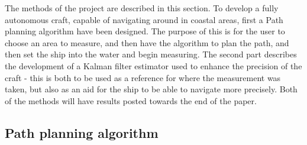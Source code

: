 \documentclass{ifacconf}
\begin{document}
The methods of the project are described in this section. To develop a fully autonomous craft, capable of navigating around in coastal areas, first a Path planning algorithm have been designed. The purpose of this is for the user to choose an area to measure, and then have the algorithm to plan the path, and then set the ship into the water and begin measuring. The second part describes the development of a Kalman filter estimator used to enhance the precision of the craft - this is both to be used as a reference for where the measurement was taken, but also as an aid for the ship to be able to navigate more precisely. Both of the methods will have results posted towards the end of the paper. 

\subsection{Path planning algorithm}
\end{document}
